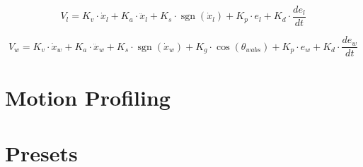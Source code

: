 \documentclass{scrartcl}
\DeclareMathOperator{\sgn}{sgn}
\begin{document}
\begin{equation} \label{Extension Control Equation}
    V_{l} = K_v \cdot \dot{x}_{l} + K_a \cdot \ddot{x}_{l} + K_s \cdot \sgn(\dot{x}_{l}) + K_p \cdot e_{l} + K_d \cdot \frac{de_{l}}{dt}
\end{equation}

\begin{equation} \label{Wrist Control Equation}
    V_{w} = K_v \cdot \dot{x}_{w} + K_a \cdot \ddot{x}_{w} + K_s \cdot \sgn(\dot{x}_{w}) + K_g \cdot \cos(\theta_{wabs}) + K_p \cdot e_{w} + K_d \cdot \frac{de_{w}}{dt}
\end{equation}

\section{Motion Profiling}

\section{Presets}
\end{document}
